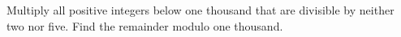 Multiply all positive integers below one thousand that are divisible by neither two nor five. Find the remainder modulo one thousand.
